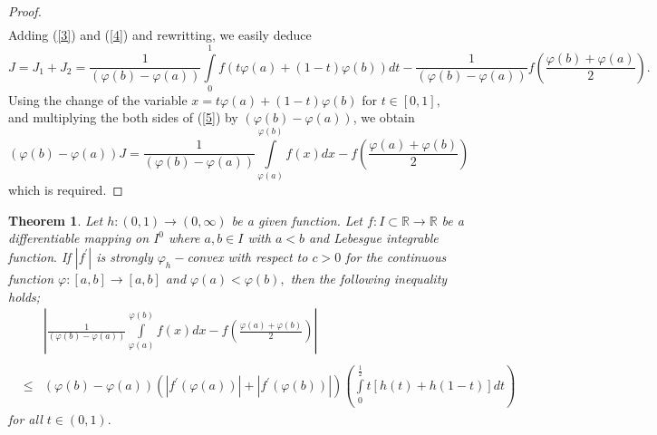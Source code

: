 \documentclass{amsart}
\newtheorem{theorem}{Theorem}
\theoremstyle{plain}
\numberwithin{equation}{section}
\begin{document}
\begin{proof}
\begin{eqnarray}
\end{eqnarray}Adding (\ref{3}) and (\ref{4}) and rewritting, we easily deduce\begin{equation}
J=J_{1}+J_{2}=\frac{1}{(\varphi (b)-\varphi (a))}\int\limits_{0}^{1}f\left(
t\varphi (a)+\left( 1-t\right) \varphi (b)\right) dt-\frac{1}{(\varphi
(b)-\varphi (a))}f\left( \frac{\varphi (b)+\varphi (a)}{2}\right) .
\label{5}
\end{equation}Using the change of the variable $x=t\varphi (a)+\left( 1-t\right) \varphi
(b)$ for $t\in \left[ 0,1\right] ,$ and multiplying the both sides of (\ref{5}) by $(\varphi (b)-\varphi (a))$, we obtain\begin{equation*}
(\varphi (b)-\varphi (a))J=\frac{1}{(\varphi (b)-\varphi (a))}\int\limits_{\varphi (a)}^{\varphi (b)}f\left( x\right) dx-f\left( \frac{\varphi (a)+\varphi (b)}{2}\right) 
\end{equation*}which is required.
\end{proof}

\begin{theorem}
\label{t3} Let $h:\left( 0,1\right) \rightarrow \left( 0,\infty \right) $ be
a given function. Let $f:I\subset 
\mathbb{R}
\rightarrow 
\mathbb{R}
$ be a differentiable mapping on $I^{0}$ where $a,b\in I$ with $a<b$ and
Lebesgue integrable function$.$ If $\left\vert f^{\prime }\right\vert $ is
strongly $\varphi _{h}-$convex with respect to $c>0$ for the continuous
function $\varphi :\left[ a,b\right] \rightarrow \left[ a,b\right] $ and $\varphi (a)<\varphi (b),$ then the following inequality holds;\begin{eqnarray*}
&&\left\vert \frac{1}{(\varphi (b)-\varphi (a))}\int\limits_{\varphi
(a)}^{\varphi (b)}f\left( x\right) dx-f\left( \frac{\varphi (a)+\varphi (b)}{2}\right) \right\vert  \\
&& \\
&\leq &(\varphi (b)-\varphi (a))\left( \left\vert f^{\prime }(\varphi
(a))\right\vert +\left\vert f^{\prime }(\varphi (b))\right\vert \right)
\left( \int\limits_{0}^{\frac{1}{2}}t\left[ h(t)+h(1-t)\right] dt\right) 
\end{eqnarray*}for all $t\in \left( 0,1\right) .$
\end{theorem}
\end{document}
